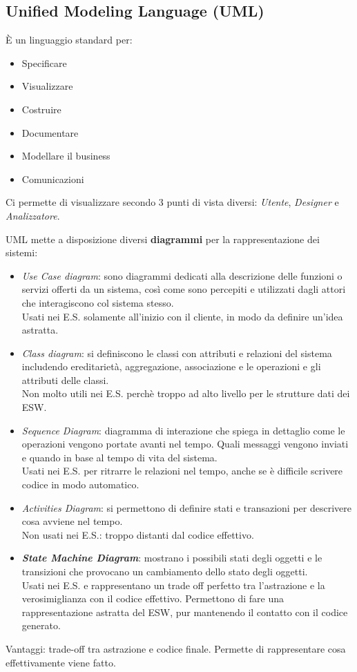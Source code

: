 \documentclass[a4paper]{article}
\theoremstyle{definition}
\begin{document}
		\subsection{Unified Modeling Language (UML)}
			È un linguaggio standard per:
			\begin{multicols}{2}
				\begin{itemize}
				\item Specificare
				\item Visualizzare
				\item Costruire
				\item Documentare
				\item Modellare il business
				\item Comunicazioni
				\end{itemize}
			\end{multicols}
			Ci permette di visualizzare secondo 3 punti di vista diversi: \textit{Utente}, \textit{Designer} e \textit{Analizzatore}.
			
			UML mette a disposizione diversi \textbf{diagrammi} per la rappresentazione dei sistemi:
			\begin{itemize}
				\item \textit{Use Case diagram}: sono diagrammi dedicati alla descrizione delle funzioni o servizi offerti da un sistema, così come sono percepiti e utilizzati dagli attori che interagiscono col sistema stesso.\\
				Usati nei E.S. solamente all'inizio con il cliente, in modo da definire un'idea astratta.
				\item \textit{Class diagram}: si definiscono le classi con attributi e relazioni del sistema includendo ereditarietà, aggregazione, associazione e le operazioni e gli attributi delle classi.\\
				Non molto utili nei E.S. perchè troppo ad alto livello per le strutture dati dei ESW.
				\item \textit{Sequence Diagram}: diagramma di interazione che spiega in dettaglio come le operazioni vengono portate avanti nel tempo. Quali messaggi vengono inviati e quando in base al tempo di vita del sistema.\\
				Usati nei E.S. per ritrarre le relazioni nel tempo, anche se è difficile scrivere codice in modo automatico.
				\item \textit{Activities Diagram}: si permettono di definire stati e transazioni per descrivere cosa avviene nel tempo.\\
				Non usati nei E.S.: troppo distanti dal codice effettivo.
				\item \textit{\textbf{State Machine Diagram}}: mostrano i possibili stati degli oggetti e le transizioni che provocano un cambiamento dello stato degli oggetti.\\
				Usati nei E.S. e rappresentano un trade off perfetto tra l'astrazione e la verosimiglianza con il codice effettivo. Permettono di fare una rappresentazione astratta del ESW, pur mantenendo il contatto con il codice generato.
			\end{itemize}
			Vantaggi: trade-off tra astrazione e codice finale. Permette di rappresentare cosa effettivamente viene fatto.
			
\end{document}
